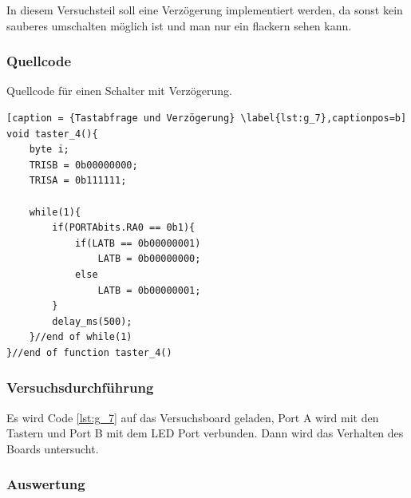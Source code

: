 \documentclass[12pt,a4paper]{article}
\begin{document}
In diesem Versuchsteil soll eine Verzögerung implementiert werden, da sonst kein sauberes umschalten möglich ist und man nur ein flackern sehen kann.

\subsubsection*{Quellcode}

Quellcode für einen Schalter mit Verzögerung.

\lstset{language=C, basicstyle=\tiny}
\begin{lstlisting}[caption = {Tastabfrage und Verzögerung} \label{lst:g_7},captionpos=b]
void taster_4(){
	byte i;
	TRISB = 0b00000000;
	TRISA = 0b111111;
	
	while(1){
		if(PORTAbits.RA0 == 0b1){
			if(LATB == 0b00000001)
				LATB = 0b00000000;
			else
				LATB = 0b00000001;
		}
		delay_ms(500);
	}//end of while(1)
}//end of function taster_4()
\end{lstlisting}

\subsubsection*{Versuchsdurchführung}

Es wird Code \ref{lst:g_7} auf das Versuchsboard geladen, Port A wird mit den Tastern und Port B mit dem LED Port verbunden. Dann wird das Verhalten des Boards untersucht.

\subsubsection*{Auswertung}
\end{document}
